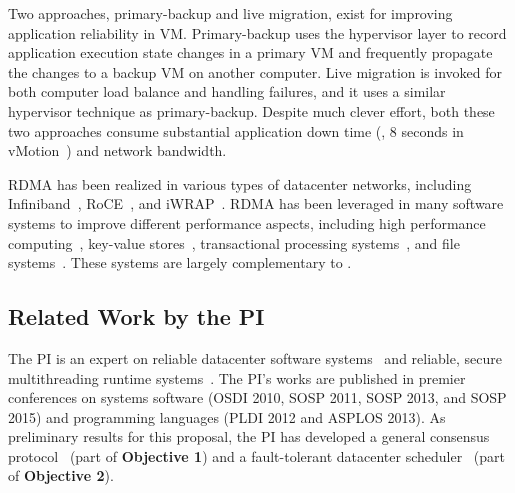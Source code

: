  Two approaches, primary-backup and live 
migration, exist for improving application reliability in VM. Primary-backup 
uses the hypervisor layer to record application execution state changes in a 
primary VM and frequently propagate the changes to a backup VM on another 
computer. Live migration is invoked for both computer load balance and handling 
failures, and it uses a similar hypervisor technique as primary-backup. Despite 
much clever effort, both these two approaches consume substantial application 
down time (\eg, 8 seconds in vMotion~\cite{vmotion:atc05}) and network 
bandwidth.


 RDMA has been realized in various types of datacenter 
networks, including Infiniband~\cite{infiniband}, RoCE~\cite{roce}, and 
iWRAP~\cite{iwrap}. RDMA has been leveraged in many software systems to improve 
different performance aspects, including high performance 
computing~\cite{openmpi}, key-value 
stores~\cite{pilaf:usenix14,herd:sigcomm14,farm:nsdi14,memcached:rdma}, 
transactional processing systems~\cite{drtm:sosp15,farm:sosp15}, and file 
systems~\cite{gibson:nfs}. These systems are largely complementary to \xxx.

\vspace{-.15in}\subsection{Related Work by the PI} 
\label{sec:my-work}\vspace{-.075in}
% 

The PI is an expert on reliable datacenter software systems~\cite{crane:sosp15, 
tripod:apsys16} and reliable, secure multithreading runtime 
systems~\cite{smt:cacm, cui:tern:osdi10, peregrine:sosp11, parrot:sosp13}. The 
PI's works are published in premier conferences on systems software (OSDI 2010, 
SOSP 2011, SOSP 2013, and SOSP 2015) and programming languages (PLDI 2012 and 
ASPLOS 2013). As preliminary results for this \xxx proposal, the PI has 
developed a general consensus protocol~\cite{crane:sosp15} (part of 
\textbf{Objective 1}) and a fault-tolerant datacenter 
scheduler~\cite{tripod:apsys16} (part of \textbf{Objective 2}).




